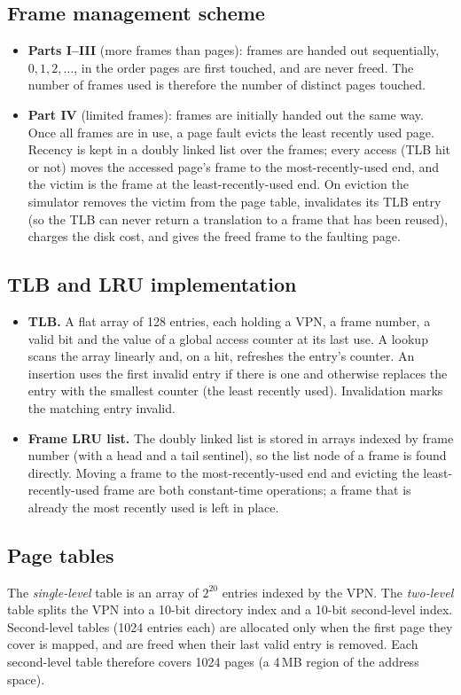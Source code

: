 \documentclass[11pt,a4paper]{article}
\begin{document}
\subsection{Frame management scheme}
\begin{itemize}
\item \textbf{Parts I--III} (more frames than pages): frames are handed out sequentially, $0,1,2,\dots$, in the order pages are first touched, and are never freed. The number of frames used is therefore the number of distinct pages touched.
\item \textbf{Part IV} (limited frames): frames are initially handed out the same way. Once all frames are in use, a page fault evicts the least recently used page. Recency is kept in a doubly linked list over the frames; every access (TLB hit or not) moves the accessed page's frame to the most-recently-used end, and the victim is the frame at the least-recently-used end. On eviction the simulator removes the victim from the page table, invalidates its TLB entry (so the TLB can never return a translation to a frame that has been reused), charges the disk cost, and gives the freed frame to the faulting page.
\end{itemize}

\subsection{TLB and LRU implementation}
\begin{itemize}
\item \textbf{TLB.} A flat array of 128 entries, each holding a VPN, a frame number, a valid bit and the value of a global access counter at its last use. A lookup scans the array linearly and, on a hit, refreshes the entry's counter. An insertion uses the first invalid entry if there is one and otherwise replaces the entry with the smallest counter (the least recently used). Invalidation marks the matching entry invalid.
\item \textbf{Frame LRU list.} The doubly linked list is stored in arrays indexed by frame number (with a head and a tail sentinel), so the list node of a frame is found directly. Moving a frame to the most-recently-used end and evicting the least-recently-used frame are both constant-time operations; a frame that is already the most recently used is left in place.
\end{itemize}

\subsection{Page tables}
The \emph{single-level} table is an array of $2^{20}$ entries indexed by the VPN. The \emph{two-level} table splits the VPN into a 10-bit directory index and a 10-bit second-level index. Second-level tables (1024 entries each) are allocated only when the first page they cover is mapped, and are freed when their last valid entry is removed. Each second-level table therefore covers 1024 pages (a 4\,MB region of the address space).
\end{document}

